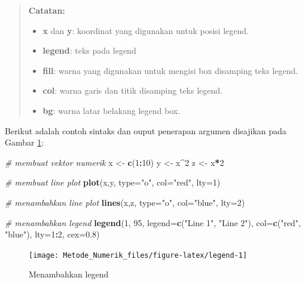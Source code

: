 \documentclass[]{book}
\newenvironment{Shaded}{\begin{snugshade}}{\end{snugshade}}
\newcommand{\CommentTok}[1]{\textcolor[rgb]{0.56,0.35,0.01}{\textit{#1}}}
\newcommand{\DataTypeTok}[1]{\textcolor[rgb]{0.13,0.29,0.53}{#1}}
\newcommand{\DecValTok}[1]{\textcolor[rgb]{0.00,0.00,0.81}{#1}}
\newcommand{\FloatTok}[1]{\textcolor[rgb]{0.00,0.00,0.81}{#1}}
\newcommand{\KeywordTok}[1]{\textcolor[rgb]{0.13,0.29,0.53}{\textbf{#1}}}
\newcommand{\NormalTok}[1]{#1}
\newcommand{\OperatorTok}[1]{\textcolor[rgb]{0.81,0.36,0.00}{\textbf{#1}}}
\newcommand{\StringTok}[1]{\textcolor[rgb]{0.31,0.60,0.02}{#1}}
\providecommand{\tightlist}{%
  \setlength{\itemsep}{0pt}\setlength{\parskip}{0pt}}
\theoremstyle{definition}
\theoremstyle{definition}
\theoremstyle{definition}
\theoremstyle{remark}
\begin{document}
\begin{quote}
\textbf{Catatan:}

\begin{itemize}
\tightlist
\item
  \textbf{x} dan \textbf{y}: koordinat yang digunakan untuk posisi legend.
\item
  \textbf{legend}: teks pada legend
\item
  \textbf{fill}: warna yang digunakan untuk mengisi box disamping teks legend.
\item
  \textbf{col}: warna garis dan titik disamping teks legend.
\item
  \textbf{bg}: warna latar belakang legend box.
\end{itemize}
\end{quote}

Berikut adalah contoh sintaks dan ouput penerapan argumen disajikan pada Gambar \ref{fig:legend}:

\begin{Shaded}
\begin{Highlighting}[]
\CommentTok{# membuat vektor numerik}
\NormalTok{x <-}\StringTok{ }\KeywordTok{c}\NormalTok{(}\DecValTok{1}\OperatorTok{:}\DecValTok{10}\NormalTok{)}
\NormalTok{y <-}\StringTok{ }\NormalTok{x}\OperatorTok{^}\DecValTok{2}
\NormalTok{z <-}\StringTok{ }\NormalTok{x}\OperatorTok{*}\DecValTok{2}

\CommentTok{# membuat line plot}
\KeywordTok{plot}\NormalTok{(x,y, }\DataTypeTok{type=}\StringTok{"o"}\NormalTok{, }\DataTypeTok{col=}\StringTok{"red"}\NormalTok{, }\DataTypeTok{lty=}\DecValTok{1}\NormalTok{)}

\CommentTok{# menambahkan line plot}
\KeywordTok{lines}\NormalTok{(x,z, }\DataTypeTok{type=}\StringTok{"o"}\NormalTok{, }\DataTypeTok{col=}\StringTok{"blue"}\NormalTok{, }\DataTypeTok{lty=}\DecValTok{2}\NormalTok{)}

\CommentTok{# menambahkan legend}
\KeywordTok{legend}\NormalTok{(}\DecValTok{1}\NormalTok{, }\DecValTok{95}\NormalTok{, }\DataTypeTok{legend=}\KeywordTok{c}\NormalTok{(}\StringTok{"Line 1"}\NormalTok{, }\StringTok{"Line 2"}\NormalTok{),}
       \DataTypeTok{col=}\KeywordTok{c}\NormalTok{(}\StringTok{"red"}\NormalTok{, }\StringTok{"blue"}\NormalTok{), }\DataTypeTok{lty=}\DecValTok{1}\OperatorTok{:}\DecValTok{2}\NormalTok{, }\DataTypeTok{cex=}\FloatTok{0.8}\NormalTok{)}
\end{Highlighting}
\end{Shaded}

\begin{figure}

{\centering \texttt{[image: Metode\_Numerik\_files/figure-latex/legend-1]} 

}

\caption{Menambahkan legend}\label{fig:legend}
\end{figure}
\end{document}
